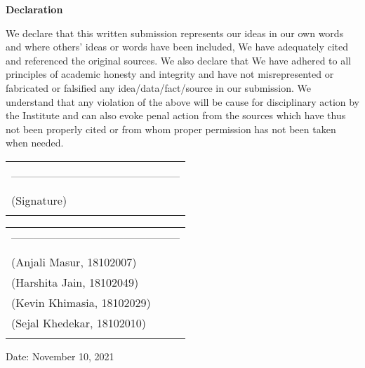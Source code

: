 \newpage
\thispagestyle{empty}
\vspace*{0.2cm}
\vspace{1cm}
\begin{center}
 \large\textbf{Declaration}
\end{center}
\vspace{1cm}
We declare that this written submission represents our ideas in our own words 
and where others' ideas or words have been included, We have adequately cited and referenced the original sources. We also declare that We have adhered to all 
principles of academic honesty and integrity and have not misrepresented 
or fabricated or falsified any idea/data/fact/source in our submission. We understand that any violation of the above will be cause for disciplinary action by the Institute and can also evoke penal action from the sources which have thus not been properly cited or from whom proper permission has not been taken when needed. 

\hfill
\begin{tabular}{@{}l@{}}
\vspace{10 mm}\\
---------------------------------------------\\
\vspace{0.5 mm}\\
\hspace{22 mm} (Signature)\\
\vspace{5 mm}
\end{tabular}

\hfill
\begin{tabular}{@{}l@{}}
---------------------------------------------\\
\vspace{0.5 mm}\\
\hspace{0.5 mm} (Anjali Masur, 18102007)\\
\hspace{0.5 mm} (Harshita Jain, 18102049)\\
\hspace{0.5 mm} (Kevin Khimasia, 18102029)\\
\hspace{0.5 mm} (Sejal Khedekar, 18102010)\\
\vspace{5 mm}
\end{tabular}


Date: November 10, 2021

\clearpage